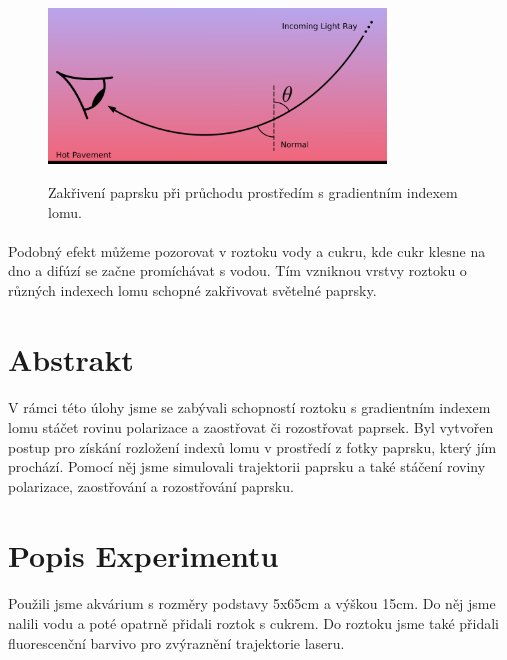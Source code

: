 \documentclass[10pt,a4paper]{article}
\begin{document}
\begin{figure}[H]
\centering
    \includegraphics[width=0.8\textwidth]{fatamor.png}
    \label{fig:uvod}
    \caption[Caption for LOF]{Zakřivení paprsku při průchodu prostředím s gradientním indexem lomu.\protect\footnotemark}
\end{figure}


\paragraph{}
Podobný efekt můžeme pozorovat v roztoku vody a cukru, kde cukr klesne na dno a difúzí se začne promíchávat s vodou. Tím vzniknou vrstvy roztoku o různých indexech lomu schopné zakřivovat světelné paprsky.

\section{Abstrakt}
\paragraph{}
V rámci této úlohy jsme se zabývali schopností roztoku s gradientním indexem lomu stáčet rovinu polarizace a zaostřovat či rozostřovat paprsek.
Byl vytvořen postup pro získání rozložení indexů lomu v prostředí z fotky paprsku, který jím prochází. Pomocí něj jsme simulovali trajektorii paprsku a také stáčení roviny polarizace, zaostřování a rozostřování paprsku.

\newpage

\section{Popis Experimentu}
\paragraph{}
Použili jsme akvárium s rozměry podstavy 5x65cm a výškou 15cm. Do něj jsme nalili vodu a poté opatrně přidali roztok s cukrem. Do roztoku jsme také přidali fluorescenční barvivo pro zvýraznění trajektorie laseru.
\end{document}
